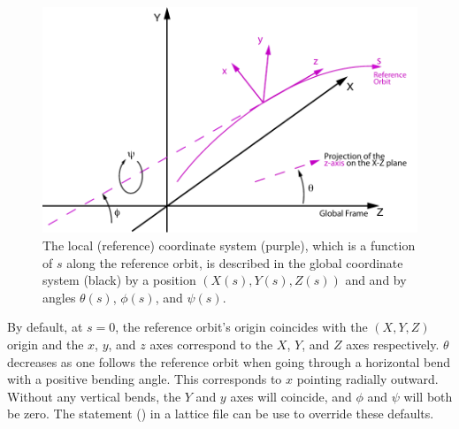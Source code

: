 \begin{figure}[tb]
  \centering
  \includegraphics{global-coords.pdf}
  \caption[The Global Coordinate System]{
The local (reference) coordinate system (purple), which is a function of $s$ along the reference
orbit, is described in the global coordinate system (black) by a position $(X(s), Y(s), Z(s))$ and
and by angles $\theta(s)$, $\phi(s)$, and $\psi(s)$.
  }
  \label{f:global.coords}
\end{figure}

By default, at $s = 0$, the reference orbit's origin coincides with the $(X, Y, Z)$ origin and the
$x$, $y$, and $z$ axes correspond to the $X$, $Y$, and $Z$ axes respectively. $\theta$ decreases as
one follows the reference orbit when going through a horizontal bend with a positive bending
angle. This corresponds to $x$ pointing radially outward. Without any vertical bends, the $Y$ and
$y$ axes will coincide, and $\phi$ and $\psi$ will both be zero. The  statement
() in a lattice file can be use to override these defaults.

